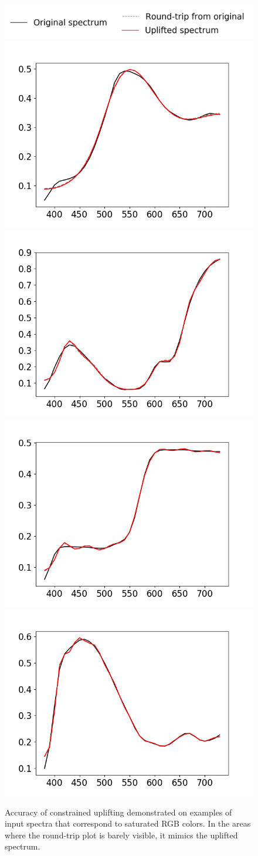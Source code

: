 \begin{figure}[ht]
	\centering
	\includegraphics[width=0.6\linewidth]{img/seeding_accuracy_legend.png}
	\includegraphics[width=0.45\linewidth]{img/seeding_accuracy_6coef.png}
	\includegraphics[width=0.45\linewidth]{img/seeding_accuracy_12coef.png}
	\vspace{0.5em}\\
	\includegraphics[width=0.45\linewidth]{img/seeding_accuracy_15coef.png}
	\includegraphics[width=0.45\linewidth]{img/seeding_accuracy_19coef.png}
	\caption{Accuracy of constrained uplifting demonstrated on examples of input spectra that correspond to saturated RGB colors. In the areas where the round-trip plot is barely visible, it mimics the uplifted spectrum.}
	\label{fig:seeding_accuracy_other}
	\vspace{-1em}
\end{figure}

